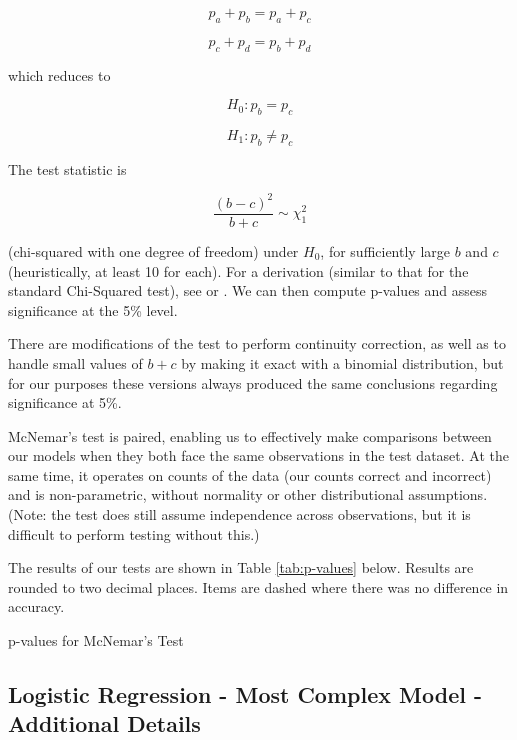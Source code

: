 \documentclass{article}[11pt]
\begin{document}
    \[
    p_{a}+p_{b}=p_{a}+p_{c}
    \]

    \[
    p_{c}+p_{d}=p_{b}+p_{d}
    \]

    which reduces to

    \[
    H_{0}:p_{b}=p_{c}
    \]

    \[
    H_{1}:p_{b}\neq p_{c}
    \]

    The test statistic is

    \[
    \frac{(b-c)^{2}}{b+c}\sim\chi_{1}^{2}
    \]

    (chi-squared with one degree of freedom) under $H_{0}$, for sufficiently large $b$ and $c$ (heuristically, at least 10 for each). For a derivation (similar to that for the standard Chi-Squared test), see \cite{mcnemar_note_1947} or \cite{rice_mathematical_2006}. We can then compute p-values and assess significance at the 5\% level.

    There are modifications of the test to perform continuity correction, as well as to handle small values of $b+c$ by making it exact with a binomial distribution, but for our purposes these versions always produced the same conclusions regarding significance at 5\%.

    McNemar's test is paired, enabling us to effectively make comparisons between our models when they both face the same observations in the test dataset. At the same time, it operates on counts of the data (our counts correct and incorrect) and is non-parametric, without normality or other distributional assumptions. (Note: the test does still assume independence across observations, but it is difficult to perform testing without this.)

    The results of our tests are shown in Table \ref{tab:p-values} below. Results are rounded to two decimal places. Items are dashed where there was no difference in accuracy.

    \begin{table}[h!]
        \centering
        \caption{p-values for McNemar's Test}
        
        \label{tab:p-values}
    \end{table}

    \clearpage
    \newpage
    \subsection{Logistic Regression - Most Complex Model - Additional Details}

    \label{sec:logistic-most-complex-model-additional-details}
\end{document}
